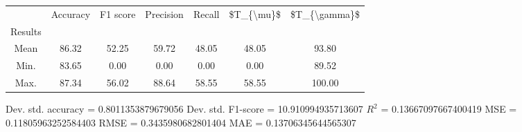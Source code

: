 \begin{tabular}{|c|c|c|c|c|c|c|}
\toprule
{} &  Accuracy &  F1 score &  Precision &  Recall &  \$T\_\{\textbackslash mu\}\$ &  \$T\_\{\textbackslash gamma\}\$ \\
Results &           &           &            &         &            &               \\
\hline
Mean    &     86.32 &     52.25 &      59.72 &   48.05 &      48.05 &         93.80 \\
Min.    &     83.65 &      0.00 &       0.00 &    0.00 &       0.00 &         89.52 \\
Max.    &     87.34 &     56.02 &      88.64 &   58.55 &      58.55 &        100.00 \\
\bottomrule
\end{tabular}

 Dev. std. accuracy = 0.8011353879679056
 Dev. std. F1-score = 10.910994935713607
 $R^2$ = 0.13667097667400419
 MSE = 0.11805963252584403
 RMSE = 0.3435980682801404
 MAE = 0.13706345644565307